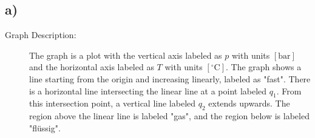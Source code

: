 

\subsection*{a)}

\begin{description}
    \item[Graph Description:] The graph is a plot with the vertical axis labeled as \( p \) with units \([ \text{bar} ]\) and the horizontal axis labeled as \( T \) with units \([ ^\circ \text{C} ]\). The graph shows a line starting from the origin and increasing linearly, labeled as "fast". There is a horizontal line intersecting the linear line at a point labeled \( q_1 \). From this intersection point, a vertical line labeled \( q_2 \) extends upwards. The region above the linear line is labeled "gas", and the region below is labeled "flüssig".
\end{description}